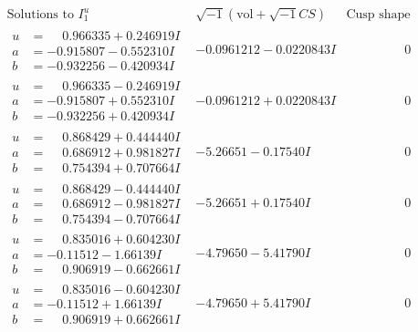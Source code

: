 \documentclass[1p]{elsarticle_modified}
\theoremstyle{definition}
\newcommand{\I}{\sqrt{-1}}
\begin{document}
$$\begin{array}{c|c|c}  
\text{Solutions to }I^u_{1}& \I (\text{vol} + \sqrt{-1}CS) & \text{Cusp shape}\\
 \hline 
\begin{aligned}
u &= \phantom{-}0.966335 + 0.246919 I \\
a &= -0.915807 - 0.552310 I \\
b &= -0.932256 - 0.420934 I\end{aligned}
 & -0.0961212 - 0.0220843 I & \phantom{-0.000000 } 0 \\ \hline\begin{aligned}
u &= \phantom{-}0.966335 - 0.246919 I \\
a &= -0.915807 + 0.552310 I \\
b &= -0.932256 + 0.420934 I\end{aligned}
 & -0.0961212 + 0.0220843 I & \phantom{-0.000000 } 0 \\ \hline\begin{aligned}
u &= \phantom{-}0.868429 + 0.444440 I \\
a &= \phantom{-}0.686912 + 0.981827 I \\
b &= \phantom{-}0.754394 + 0.707664 I\end{aligned}
 & -5.26651 - 0.17540 I & \phantom{-0.000000 } 0 \\ \hline\begin{aligned}
u &= \phantom{-}0.868429 - 0.444440 I \\
a &= \phantom{-}0.686912 - 0.981827 I \\
b &= \phantom{-}0.754394 - 0.707664 I\end{aligned}
 & -5.26651 + 0.17540 I & \phantom{-0.000000 } 0 \\ \hline\begin{aligned}
u &= \phantom{-}0.835016 + 0.604230 I \\
a &= -0.11512 - 1.66139 I \\
b &= \phantom{-}0.906919 - 0.662661 I\end{aligned}
 & -4.79650 - 5.41790 I & \phantom{-0.000000 } 0 \\ \hline\begin{aligned}
u &= \phantom{-}0.835016 - 0.604230 I \\
a &= -0.11512 + 1.66139 I \\
b &= \phantom{-}0.906919 + 0.662661 I\end{aligned}
 & -4.79650 + 5.41790 I & \phantom{-0.000000 } 0 \\ \hline\begin{aligned}

\end{aligned}
\end{array}$$
\end{document}
